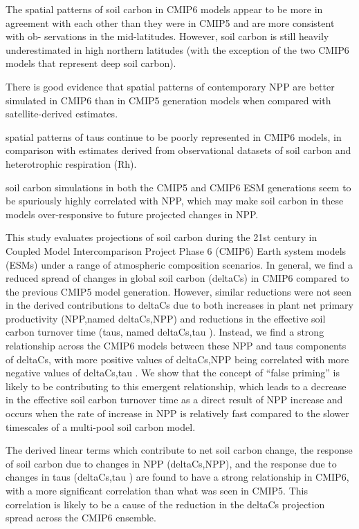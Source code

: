\documentclass{article}
\begin{document}
The spatial patterns of soil carbon in CMIP6 models appear to be more in agreement with each other than they were in CMIP5 and are more consistent with ob-
servations in the mid-latitudes. However, soil carbon is still heavily underestimated in high northern latitudes (with the exception of the two CMIP6 models that represent deep soil carbon).

There is good evidence that spatial patterns of contemporary NPP are better simulated in CMIP6 than in CMIP5 generation models when compared with satellite-derived estimates.

spatial patterns of taus continue to be poorly represented in CMIP6 models, in comparison with estimates derived from observational datasets of soil carbon
and heterotrophic respiration (Rh).

soil carbon simulations in both the CMIP5 and CMIP6 ESM generations seem to be spuriously highly correlated with NPP, which may make soil carbon in these models over-responsive to future projected changes in NPP.

\citep{Varney2023}
This study evaluates projections of soil carbon during the 21st century in Coupled Model Intercomparison Project Phase 6 (CMIP6) Earth system models (ESMs) under a range of atmospheric composition scenarios. In general, we ﬁnd a reduced spread of changes in global soil carbon (deltaCs) in CMIP6 compared to the previous CMIP5 model generation. However, similar reductions were not seen in the derived contributions to deltaCs due to both increases in plant net primary productivity (NPP,named deltaCs,NPP) and reductions in the effective soil carbon turnover time (taus, named deltaCs,tau ). Instead, we ﬁnd a strong relationship across the CMIP6 models between these NPP and taus components of deltaCs, with more positive values of deltaCs,NPP being correlated with more negative values of deltaCs,tau . We
show that the concept of “false priming” is likely to be contributing to this emergent relationship, which leads to a decrease in the effective soil carbon turnover time as a direct result of NPP increase and occurs when the rate of increase in NPP is relatively fast compared to the slower timescales of a multi-pool soil carbon model.

The derived linear terms which contribute to net soil carbon change, the response of soil carbon due to changes in NPP (deltaCs,NPP), and the response due to changes in taus (deltaCs,tau ) are found to have a strong relationship in CMIP6, with a more signiﬁcant correlation than what was seen in CMIP5. This correlation is likely to be a cause of the reduction in the deltaCs projection spread
across the CMIP6 ensemble.
\end{document}
